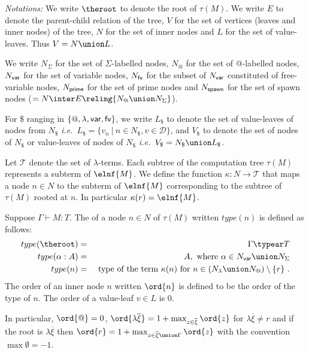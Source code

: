 \emph{Notations:} We write $\theroot$ to denote the root of
$\tau(M)$. We write $E$ to denote the parent-child relation of the
tree, $V$ for the set of vertices (leaves and inner nodes) of the
tree, $N$ for the set of inner nodes and $L$ for the set of
value-leaves. Thus $V = N \union L$.

We write $N_\Sigma$ for the set of $\Sigma$-labelled nodes, $N_@$ for the set
of @-labelled nodes, $N_{\sf var}$ for the set of variable nodes,
$N_{\sf fv}$ for the subset of $N_{\sf var}$ constituted of free-variable nodes, $N_{\sf prime}$ for the set of prime nodes
and $N_{\sf spawn}$ for the set of spawn nodes ($= N \inter E \relimg{N_@ \union N_\Sigma}$).

For $\$$ ranging in $\{@, \lambda, {\sf var}, {\sf fv} \}$,
we write $L_\$$ to denote the set of value-leaves of nodes from $N_\$$
{\it i.e.}\ $L_\$ = \{ v_n \ | \ n \in N_\$, v \in \mathcal{D} \}$,
and $V_\$$ to denote the set of nodes of $N_\$$ or value-leaves of nodes of $N_\$$
{\it i.e.}\ $V_\$ = N_\$ \union L_\$ $.


Let $\mathcal{T}$ denote the set of $\lambda$-terms.
Each subtree of the computation tree $\tau(M)$ represents a subterm of $\elnf{M}$.
We define the function $\kappa : N \rightarrow \mathcal{T}$ that maps a node $n \in N$ to the subterm of $\elnf{M}$
corresponding to the subtree of $\tau(M)$ rooted at $n$.
In particular $\kappa(r) = \elnf{M}$.

\begin{definition}
\label{def:nodeorder}
Suppose $\Gamma \vdash M : T$.
The  of a node $n \in N$ of $\tau(M)$ written $type(n)$ is defined as follows:
\begin{eqnarray*}
type(\theroot) &=& \Gamma \typear T \\
type(\alpha:A) &=& A, \mbox{ where $\alpha \in N_{\sf var} \union N_\Sigma$} \\
type(n) &=& \hbox{ type of the term $\kappa(n)$ for $n \in (N_\lambda \union N_@) \setminus \{r \}$\ .}
\end{eqnarray*}
The order of an inner node $n$ written $\ord{n}$ is defined to be
the order of the type of $n$. The order of a value-leaf $v \in L$ is
$0$.
\end{definition}

In particular, $\ord{@} = 0$, $\ord{\lambda \overline{\xi}} = 1+
\max_{z\in \overline{\xi}} \ord{z}$ for $\lambda \overline{\xi}\neq
r$ and if the root is $\lambda \overline{\xi}$ then $\ord{r} = 1 + \max_{z\in
\overline{\xi}\union \Gamma} \ord{z}$ with the convention $\max
\emptyset = -1$.

